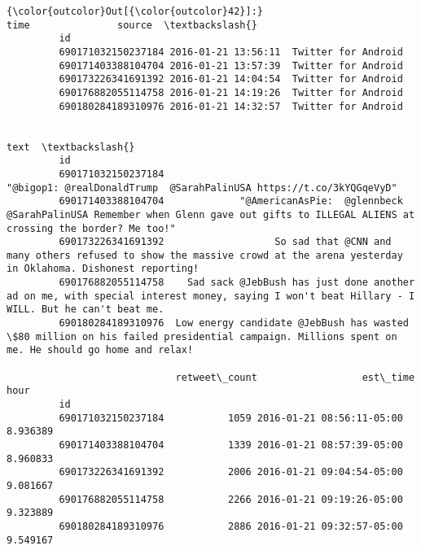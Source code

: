 \documentclass[11pt]{article}
\begin{document}
\begin{Verbatim}[commandchars=\\\{\}]
{\color{outcolor}Out[{\color{outcolor}42}]:}                                   time               source  \textbackslash{}
         id                                                            
         690171032150237184 2016-01-21 13:56:11  Twitter for Android   
         690171403388104704 2016-01-21 13:57:39  Twitter for Android   
         690173226341691392 2016-01-21 14:04:54  Twitter for Android   
         690176882055114758 2016-01-21 14:19:26  Twitter for Android   
         690180284189310976 2016-01-21 14:32:57  Twitter for Android   
         
                                                                                                                                                                     text  \textbackslash{}
         id                                                                                                                                                                 
         690171032150237184                                                                           "@bigop1: @realDonaldTrump  @SarahPalinUSA https://t.co/3kYQGqeVyD"   
         690171403388104704             "@AmericanAsPie:  @glennbeck @SarahPalinUSA Remember when Glenn gave out gifts to ILLEGAL ALIENS at crossing the border? Me too!"   
         690173226341691392                   So sad that @CNN and many others refused to show the massive crowd at the arena yesterday in Oklahoma. Dishonest reporting!   
         690176882055114758    Sad sack @JebBush has just done another ad on me, with special interest money, saying I won't beat Hillary - I WILL. But he can't beat me.   
         690180284189310976  Low energy candidate @JebBush has wasted \$80 million on his failed presidential campaign. Millions spent on me. He should go home and relax!   
         
                             retweet\_count                  est\_time      hour  
         id                                                                     
         690171032150237184           1059 2016-01-21 08:56:11-05:00  8.936389  
         690171403388104704           1339 2016-01-21 08:57:39-05:00  8.960833  
         690173226341691392           2006 2016-01-21 09:04:54-05:00  9.081667  
         690176882055114758           2266 2016-01-21 09:19:26-05:00  9.323889  
         690180284189310976           2886 2016-01-21 09:32:57-05:00  9.549167  
\end{Verbatim}
            
\end{document}
